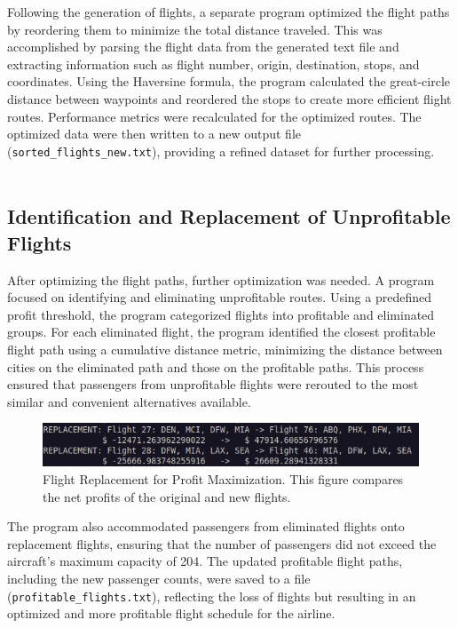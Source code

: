 \documentclass{article}
\begin{document}
Following the generation of flights, a separate program optimized the flight paths by reordering them to minimize the total distance traveled. This was accomplished by parsing the flight data from the generated text file and extracting information such as flight number, origin, destination, stops, and coordinates. Using the Haversine formula, the program calculated the great-circle distance between waypoints and reordered the stops to create more efficient flight routes. Performance metrics were recalculated for the optimized routes. The optimized data were then written to a new output file (\texttt{sorted\_flights\_new.txt}), providing a refined dataset for further processing.\\
\\
\subsection*{Identification and Replacement of Unprofitable Flights}
After optimizing the flight paths, further optimization was needed. A program focused on identifying and eliminating unprofitable routes. Using a predefined profit threshold, the program categorized flights into profitable and eliminated groups. For each eliminated flight, the program identified the closest profitable flight path using a cumulative distance metric, minimizing the distance between cities on the eliminated path and those on the profitable paths. This process ensured that passengers from unprofitable flights were rerouted to the most similar and convenient alternatives available. 

\begin{figure}[H]
\centering
\includegraphics[width=\textwidth]{images/replacement.png}
\caption{Flight Replacement for Profit Maximization. This figure compares the net profits of the original and new flights.}
\label{fig:replacement}
\end{figure}

The program also accommodated passengers from eliminated flights onto replacement flights, ensuring that the number of passengers did not exceed the aircraft's maximum capacity of 204. The updated profitable flight paths, including the new passenger counts, were saved to a file (\texttt{profitable\_flights.txt}), reflecting the loss of flights but resulting in an optimized and more profitable flight schedule for the airline. 
\end{document}
